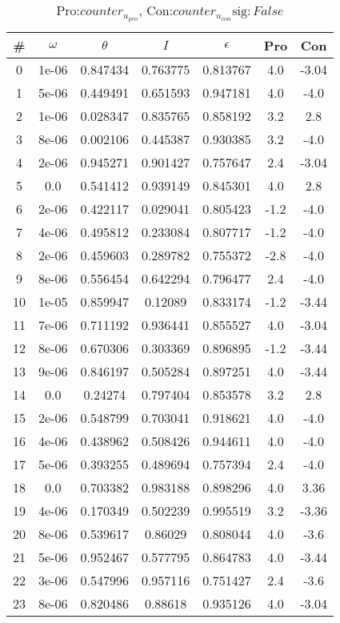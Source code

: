 \begin{table}
\caption{Pro:$counter_{u_{pro}}$, Con:$counter_{u_{con}}$$\mathrm{sig}:False$}
\begin{tabular}{c|c|c|c|c|c|c}
\# & $\omega$ & $\theta$ & $I$ & $\epsilon$ & Pro & Con\\
\hline
0 & 1e-06 & 0.847434 & 0.763775 & 0.813767 & 4.0 & -3.04\\
1 & 5e-06 & 0.449491 & 0.651593 & 0.947181 & 4.0 & -4.0\\
2 & 1e-06 & 0.028347 & 0.835765 & 0.858192 & 3.2 & 2.8\\
3 & 8e-06 & 0.002106 & 0.445387 & 0.930385 & 3.2 & -4.0\\
4 & 2e-06 & 0.945271 & 0.901427 & 0.757647 & 2.4 & -3.04\\
5 & 0.0 & 0.541412 & 0.939149 & 0.845301 & 4.0 & 2.8\\
6 & 2e-06 & 0.422117 & 0.029041 & 0.805423 & -1.2 & -4.0\\
7 & 4e-06 & 0.495812 & 0.233084 & 0.807717 & -1.2 & -4.0\\
8 & 2e-06 & 0.459603 & 0.289782 & 0.755372 & -2.8 & -4.0\\
9 & 8e-06 & 0.556454 & 0.642294 & 0.796477 & 2.4 & -4.0\\
10 & 1e-05 & 0.859947 & 0.12089 & 0.833174 & -1.2 & -3.44\\
11 & 7e-06 & 0.711192 & 0.936441 & 0.855527 & 4.0 & -3.04\\
12 & 8e-06 & 0.670306 & 0.303369 & 0.896895 & -1.2 & -3.44\\
13 & 9e-06 & 0.846197 & 0.505284 & 0.897251 & 4.0 & -3.44\\
14 & 0.0 & 0.24274 & 0.797404 & 0.853578 & 3.2 & 2.8\\
15 & 2e-06 & 0.548799 & 0.703041 & 0.918621 & 4.0 & -4.0\\
16 & 4e-06 & 0.438962 & 0.508426 & 0.944611 & 4.0 & -4.0\\
17 & 5e-06 & 0.393255 & 0.489694 & 0.757394 & 2.4 & -4.0\\
18 & 0.0 & 0.703382 & 0.983188 & 0.898296 & 4.0 & 3.36\\
19 & 4e-06 & 0.170349 & 0.502239 & 0.995519 & 3.2 & -3.36\\
20 & 8e-06 & 0.539617 & 0.86029 & 0.808044 & 4.0 & -3.6\\
21 & 5e-06 & 0.952467 & 0.577795 & 0.864783 & 4.0 & -3.44\\
22 & 3e-06 & 0.547996 & 0.957116 & 0.751427 & 2.4 & -3.6\\
23 & 8e-06 & 0.820486 & 0.88618 & 0.935126 & 4.0 & -3.04\\

\end{tabular}
\end{table}
